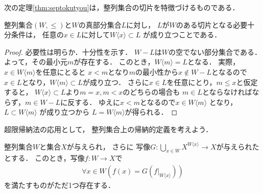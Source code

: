   次の定理\ref{thm:septokutyou}は，整列集合の切片を特徴づけるものである．

  \begin{thm} \label{thm:septokutyou}
    整列集合$(W, {\leq})$と$W$の真部分集合$L$に対し，
    $L$が$W$のある切片となる必要十分条件は，
    任意の$x \in L$に対して$W \langle x \rangle \subset L$
    が成り立つことである．
  \end{thm}

  \begin{proof}
    必要性は明らか．十分性を示す．
    $W-L$は$W$の空でない部分集合である．
    よって，その最小元$m$が存在する．
    このとき，$W \langle m \rangle =L$となる．
    実際，$x \in W \langle m \rangle$を任意にとると
    $x <m$となり$m$の最小性から$x \notin W-L$となるので
    $x \in L$となり，$W \langle m \rangle \subset L$が成り立つ．
    さらに$x \in L$を任意にとり，$m \leq x$と仮定すると，
    $W \langle x \rangle \subset L$より$m=x, m<x$のどちらの場合も
    $m \in L$とならなければならず，$m \in W-L$に反する．
    ゆえに$x<m$となるので$x \in W \langle m \rangle$
    となり，$L \subset W \langle m \rangle$
    が成り立つから
    $L=W \langle m \rangle$が得られる．
  \end{proof}

  超限帰納法の応用として，
  整列集合上の帰納的定義を考えよう．

 \begin{thm} \label{thm:saikiteigi}
     整列集合$W$と集合$X$が与えられ，
     さらに
     写像$G: \bigcup_{x \in W} X^{W \langle x \rangle} 
     \longrightarrow X$が与えられたとする．
     このとき，写像$f: W \longrightarrow X$で
     \begin{align}
       \forall x \in W \left( f(x) 
       = G \left( f|_{W \langle x \rangle} \right) \right)
       \label{eq:saikiteigi}
     \end{align}
     を満たすものがただ1つ存在する．
   \end{thm}

